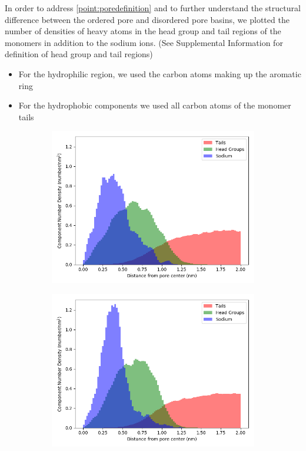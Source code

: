 \documentclass{article}
\begin{document}

  In order to address \ref{point:poredefinition} and to further understand the structural difference 
  between the ordered pore and disordered pore basins, we plotted the number of densities of
  heavy atoms in the head group and tail regions of the monomers in addition to the sodium ions.
  (See Supplemental Information for definition of head group and tail regions) 
  \begin{itemize}
	\item For the hydrophilic region, we used the carbon atoms making up the aromatic ring
	\item For the hydrophobic components we used all carbon atoms of the monomer tails
  \end{itemize} 

  \begin{figure}
  \centering
  \begin{subfigure}{0.55\textwidth}
        \includegraphics[width=1\linewidth]{offset_density.png}
        \caption{}
        \label{fig:offset_density}
  \end{subfigure}
  \begin{subfigure}{0.55\textwidth}
        \includegraphics[width=1\linewidth]{layered_density.png}

\end{subfigure}
\end{figure}
\end{document}
